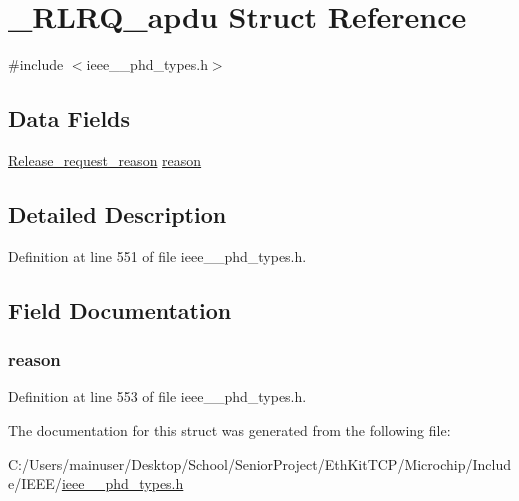 \hypertarget{struct___r_l_r_q__apdu}{}\section{\+\_\+\+R\+L\+R\+Q\+\_\+apdu Struct Reference}
\label{struct___r_l_r_q__apdu}


{\ttfamily \#include $<$ieee\+\_\+\_\+phd\+\_\+types.\+h$>$}

\subsection*{Data Fields}
\begin{DoxyCompactItemize}
\item 
\hyperlink{ieee__11073__phd__types_8h_a34f4be1fd1ff22b0c94524e5f9c29bba}{Release\+\_\+request\+\_\+reason} \hyperlink{struct___r_l_r_q__apdu_af7573814df53e8ff09bd13db0dff7b4c}{reason}
\end{DoxyCompactItemize}


\subsection{Detailed Description}


Definition at line 551 of file ieee\+\_\+\_\+phd\+\_\+types.\+h.



\subsection{Field Documentation}
\hypertarget{struct___r_l_r_q__apdu_af7573814df53e8ff09bd13db0dff7b4c}{}
\subsubsection[{reason}]{ reason}\label{struct___r_l_r_q__apdu_af7573814df53e8ff09bd13db0dff7b4c}


Definition at line 553 of file ieee\+\_\+\_\+phd\+\_\+types.\+h.



The documentation for this struct was generated from the following file\+:\begin{DoxyCompactItemize}
\item 
C\+:/\+Users/mainuser/\+Desktop/\+School/\+Senior\+Project/\+Eth\+Kit\+T\+C\+P/\+Microchip/\+Include/\+I\+E\+E\+E/\hyperlink{ieee__11073__phd__types_8h}{ieee\+\_\+\_\+phd\+\_\+types.\+h}\end{DoxyCompactItemize}
